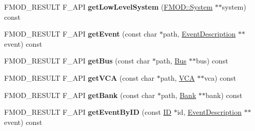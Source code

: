 \begin{DoxyCompactItemize}
\item 
\hypertarget{class_f_m_o_d_1_1_studio_1_1_system_ac9fa1740615fb7a8312ce9f8c3d32e7c}{F\+M\+O\+D\+\_\+\+R\+E\+S\+U\+L\+T F\+\_\+\+A\+P\+I {\bfseries get\+Low\+Level\+System} (\hyperlink{class_f_m_o_d_1_1_system}{F\+M\+O\+D\+::\+System} $\ast$$\ast$system) const }\label{class_f_m_o_d_1_1_studio_1_1_system_ac9fa1740615fb7a8312ce9f8c3d32e7c}

\item 
\hypertarget{class_f_m_o_d_1_1_studio_1_1_system_a5f71424a03ec2ab225445f4a9dc5e846}{F\+M\+O\+D\+\_\+\+R\+E\+S\+U\+L\+T F\+\_\+\+A\+P\+I {\bfseries get\+Event} (const char $\ast$path, \hyperlink{class_f_m_o_d_1_1_studio_1_1_event_description}{Event\+Description} $\ast$$\ast$event) const }\label{class_f_m_o_d_1_1_studio_1_1_system_a5f71424a03ec2ab225445f4a9dc5e846}

\item 
\hypertarget{class_f_m_o_d_1_1_studio_1_1_system_ad2ec2f9a5de4ec27917059db31c926df}{F\+M\+O\+D\+\_\+\+R\+E\+S\+U\+L\+T F\+\_\+\+A\+P\+I {\bfseries get\+Bus} (const char $\ast$path, \hyperlink{class_f_m_o_d_1_1_studio_1_1_bus}{Bus} $\ast$$\ast$bus) const }\label{class_f_m_o_d_1_1_studio_1_1_system_ad2ec2f9a5de4ec27917059db31c926df}

\item 
\hypertarget{class_f_m_o_d_1_1_studio_1_1_system_a39556e8dc7277fd28a55b839044e4827}{F\+M\+O\+D\+\_\+\+R\+E\+S\+U\+L\+T F\+\_\+\+A\+P\+I {\bfseries get\+V\+C\+A} (const char $\ast$path, \hyperlink{class_f_m_o_d_1_1_studio_1_1_v_c_a}{V\+C\+A} $\ast$$\ast$vca) const }\label{class_f_m_o_d_1_1_studio_1_1_system_a39556e8dc7277fd28a55b839044e4827}

\item 
\hypertarget{class_f_m_o_d_1_1_studio_1_1_system_a84ce7417d7d3626d5bc913a1dd064900}{F\+M\+O\+D\+\_\+\+R\+E\+S\+U\+L\+T F\+\_\+\+A\+P\+I {\bfseries get\+Bank} (const char $\ast$path, \hyperlink{class_f_m_o_d_1_1_studio_1_1_bank}{Bank} $\ast$$\ast$bank) const }\label{class_f_m_o_d_1_1_studio_1_1_system_a84ce7417d7d3626d5bc913a1dd064900}

\item 
\hypertarget{class_f_m_o_d_1_1_studio_1_1_system_a2b98fb95e33fc6dcf3339bcff8ce3c63}{F\+M\+O\+D\+\_\+\+R\+E\+S\+U\+L\+T F\+\_\+\+A\+P\+I {\bfseries get\+Event\+By\+I\+D} (const \hyperlink{struct_f_m_o_d___g_u_i_d}{I\+D} $\ast$id, \hyperlink{class_f_m_o_d_1_1_studio_1_1_event_description}{Event\+Description} $\ast$$\ast$event) const }\label{class_f_m_o_d_1_1_studio_1_1_system_a2b98fb95e33fc6dcf3339bcff8ce3c63}


\end{DoxyCompactItemize}
